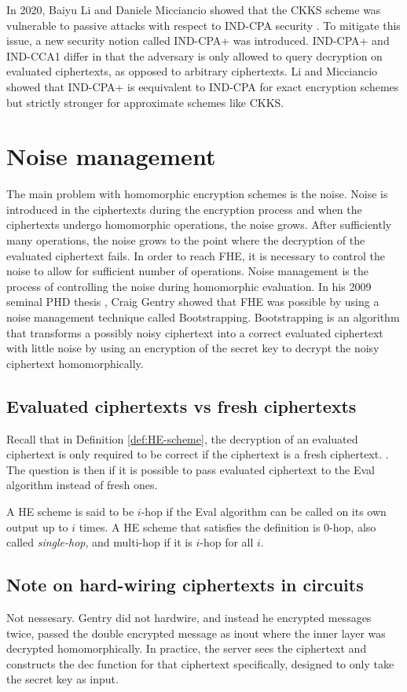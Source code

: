 In 2020, Baiyu Li and Daniele Micciancio showed that the CKKS scheme was vulnerable to passive attacks with respect to IND-CPA security \cite{CKKS-attack}. To mitigate this issue, a new security notion called IND-CPA+ was introduced. IND-CPA+ and IND-CCA1 differ in that the adversary is only allowed to query decryption on evaluated ciphertexts, as opposed to arbitrary ciphertexts. Li and Micciancio showed that IND-CPA+ is eequivalent to IND-CPA for exact encryption schemes but strictly stronger for approximate schemes like CKKS. 

\chapter{Noise management}

The main problem with homomorphic encryption schemes is the noise. Noise is introduced in the ciphertexts during the encryption process and when the ciphertexts undergo homomorphic operations, the noise grows. After sufficiently many operations, the noise grows to the point where the decryption of the evaluated ciphertext fails. In order to reach FHE, it is necessary to control the noise to allow for sufficient number of operations. Noise management is the process of controlling the noise during homomorphic evaluation. In his 2009 seminal PHD thesis \cite{Gentry-Thesis}, Craig Gentry showed that FHE was possible by using a noise management technique called Bootstrapping. Bootstrapping is an algorithm that transforms a possibly noisy ciphertext into a correct evaluated ciphertext with little noise by using an encryption of the secret key to decrypt the noisy ciphertext homomorphically.

\section{Evaluated ciphertexts vs fresh ciphertexts}
Recall that in Definition \ref{def:HE-scheme}, the decryption of an evaluated ciphertext is only required to be correct if the ciphertext is a fresh ciphertext. . The question is then if it is possible to pass evaluated ciphertext to the Eval algorithm instead of fresh ones.

A HE scheme is said to be $i$-hop if the Eval algorithm can be called on its own output up to $i$ times. A HE scheme that satisfies the definition is $0$-hop, also called \emph{single-hop}, and multi-hop if it is $i$-hop for all $i$. 

\section{Note on hard-wiring ciphertexts in circuits}
Not nessesary. Gentry did not hardwire, and instead he encrypted messages twice, passed the double encrypted message as inout where the inner layer was decrypted homomorphically.
In practice, the server sees the ciphertext and constructs the dec function for that ciphertext specifically, designed to only take the secret key as input.

